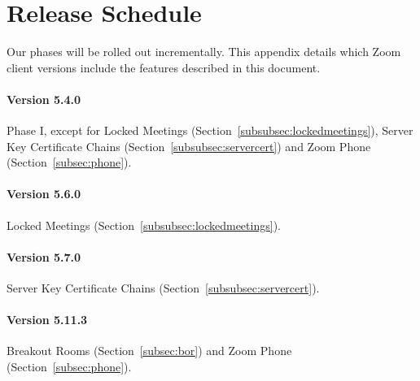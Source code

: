 \section{Release Schedule}
\label{appendix:releases}
Our phases will be rolled out incrementally. This appendix details which Zoom client versions include the features described in this document.

\paragraph{Version 5.4.0}
Phase I, except for Locked Meetings (Section~\ref{subsubsec:lockedmeetings}), Server Key Certificate Chains (Section~\ref{subsubsec:servercert}) and Zoom Phone (Section~\ref{subsec:phone}).

\paragraph{Version 5.6.0}
Locked Meetings (Section~\ref{subsubsec:lockedmeetings}).

\paragraph{Version 5.7.0}
Server Key Certificate Chains (Section~\ref{subsubsec:servercert}).

\paragraph{Version 5.11.3}
Breakout Rooms (Section~\ref{subsec:bor}) and Zoom Phone (Section~\ref{subsec:phone}).